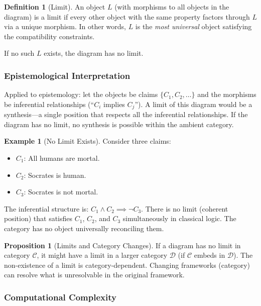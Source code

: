 \documentclass[11pt,letterpaper]{article}
\theoremstyle{definition}
\newtheorem{definition}{Definition}[section]
\newtheorem{proposition}{Proposition}[section]
\newtheorem{example}{Example}[section]
\theoremstyle{remark}
\begin{document}
\begin{definition}[Limit]
An object $L$ (with morphisms to all objects in the diagram) is a limit if every other object with the same property factors through $L$ via a unique morphism. In other words, $L$ is the \emph{most universal} object satisfying the compatibility constraints.
\end{definition}

If no such $L$ exists, the diagram has no limit.

\subsubsection*{Epistemological Interpretation}

Applied to epistemology: let the objects be claims $\{C_1, C_2, \ldots\}$ and the morphisms be inferential relationships (``$C_i$ implies $C_j$''). A limit of this diagram would be a synthesis---a single position that respects all the inferential relationships. If the diagram has no limit, no synthesis is possible within the ambient category.

\begin{example}[No Limit Exists]
Consider three claims:
\begin{itemize}
\item $C_1$: All humans are mortal.
\item $C_2$: Socrates is human.
\item $C_3$: Socrates is not mortal.
\end{itemize}
The inferential structure is: $C_1 \wedge C_2 \implies \neg C_3$. There is no limit (coherent position) that satisfies $C_1$, $C_2$, and $C_3$ simultaneously in classical logic. The category has no object universally reconciling them.
\end{example}

\begin{proposition}[Limits and Category Changes]
If a diagram has no limit in category $\mathcal{C}$, it might have a limit in a larger category $\mathcal{D}$ (if $\mathcal{C}$ embeds in $\mathcal{D}$). The non-existence of a limit is category-dependent. Changing frameworks (category) can resolve what is unresolvable in the original framework.
\end{proposition}

\subsubsection*{Computational Complexity}
\end{document}
